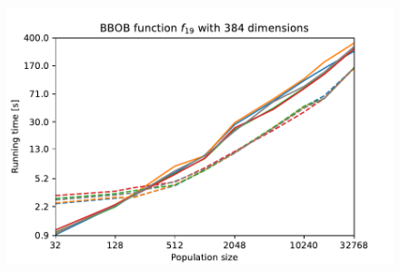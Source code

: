\begin{figure}[ht!]
\begin{minipage}[t]{0.32\textwidth}
    \end{minipage}
    \hfill
    \begin{minipage}[t]{0.32\textwidth}
        \centering
        \includegraphics[width=\textwidth]{img/runs/time_es_crossover_fn19_384d.pdf}
    \end{minipage}


\end{figure}

